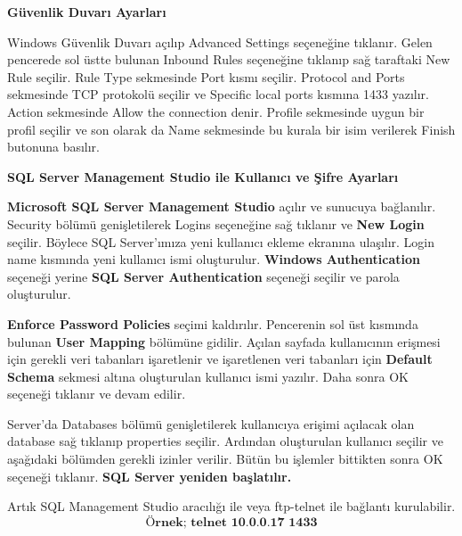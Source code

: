 \documentclass[a4paper,10pt]{article}
\begin{document}
\pagebreak

\textbf{Güvenlik Duvarı Ayarları}

\vspace{0.5cm}

Windows Güvenlik Duvarı açılıp Advanced Settings seçeneğine tıklanır. Gelen pencerede sol
üstte bulunan Inbound Rules seçeneğine tıklanıp sağ taraftaki New Rule seçilir. Rule Type sekmesinde
Port kısmı seçilir. Protocol and Ports sekmesinde TCP protokolü seçilir ve Specific local ports kısmına 
1433 yazılır. Action sekmesinde Allow the connection denir. Profile sekmesinde uygun bir profil seçilir ve
son olarak da Name sekmesinde bu kurala bir isim verilerek Finish butonuna basılır.

\vspace{0.5cm}

\textbf{SQL Server Management Studio ile Kullanıcı ve Şifre Ayarları}

\vspace{0.5cm}

\textbf{Microsoft SQL Server Management Studio} açılır ve sunucuya bağlanılır. Security bölümü
genişletilerek Logins seçeneğine sağ tıklanır ve \textbf{New Login} seçilir. Böylece SQL Server’ımıza yeni kullanıcı
ekleme ekranına ulaşılır. Login name kısmında yeni kullanıcı ismi oluşturulur. \textbf{Windows Authentication}
seçeneği yerine \textbf{SQL Server Authentication} seçeneği seçilir ve parola oluşturulur. 

\vspace{0.2cm}
\textbf{Enforce Password Policies} seçimi kaldırılır. Pencerenin sol üst kısmında bulunan \textbf{User Mapping}
bölümüne gidilir. Açılan sayfada kullanıcının erişmesi için gerekli veri tabanları işaretlenir ve işaretlenen
veri tabanları için \textbf{Default Schema} sekmesi altına oluşturulan kullanıcı ismi yazılır. Daha sonra OK
seçeneği tıklanır ve devam edilir.

\vspace{0.2cm}
Server’da Databases bölümü genişletilerek kullanıcıya erişimi açılacak olan database sağ tıklanıp
properties seçilir. Ardından oluşturulan kullanıcı seçilir ve aşağıdaki bölümden gerekli izinler verilir.
Bütün bu işlemler bittikten sonra OK seçeneği tıklanır. \textbf{SQL Server yeniden başlatılır.}

\vspace{0.2cm}

Artık SQL Management Studio aracılığı ile veya ftp-telnet ile bağlantı kurulabilir.
$$\textbf{Örnek; telnet 10.0.0.17 1433}$$
\end{document}
